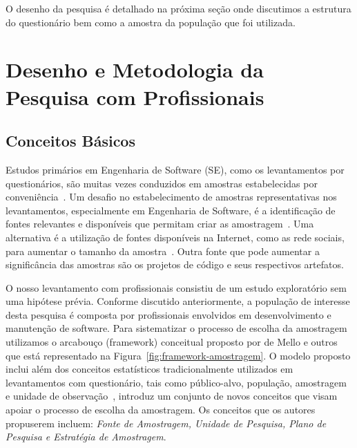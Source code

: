 O desenho da pesquisa é detalhado na próxima seção onde discutimos a estrutura
do questionário bem como a amostra da população que foi utilizada.

\section{Desenho e Metodologia da Pesquisa com Profissionais}
\label{sec:desenho_da_pesquisa_com_profissionais}

\subsection{Conceitos Básicos}

Estudos primários em Engenharia de Software (SE), como os levantamentos por
questionários, são muitas vezes conduzidos em amostras estabelecidas por
conveniência~\cite{sjoberg2005survey, dybaa2006systematic}. Um desafio no
estabelecimento de amostras representativas nos levantamentos, especialmente em
Engenharia de Software, é a identificação de fontes relevantes e disponíveis que
permitam criar as amostragem~\cite{de2014towards}. Uma alternativa é a
utilização de fontes disponíveis na Internet, como as rede sociais, para
aumentar o tamanho da amostra~\cite{de2013would}. Outra fonte que pode aumentar
a significância das amostras são os projetos de código e seus respectivos
artefatos.

O nosso levantamento com profissionais consistiu de um estudo exploratório sem
uma hipótese prévia. Conforme discutido anteriormente, a população de interesse
desta pesquisa é composta por profissionais envolvidos em desenvolvimento e
manutenção de software. Para sistematizar o processo de escolha da amostragem
utilizamos o arcabouço (framework) conceitual proposto por de Mello e
outros~\cite{de2014towards} que está representado na
Figura~\ref{fig:framework-amostragem}. O modelo proposto inclui além dos
conceitos estatísticos tradicionalmente utilizados em levantamentos com
questionário, tais como público-alvo, população, amostragem e unidade de
observação~\cite{thompson2012sampling}, introduz um conjunto de novos conceitos
que visam apoiar o processo de escolha da amostragem. Os conceitos que os
autores propuserem incluem: \textit{Fonte de Amostragem, Unidade de Pesquisa,
	Plano de Pesquisa e Estratégia de Amostragem}.

